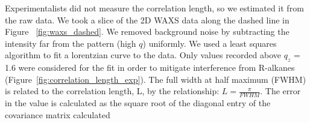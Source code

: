 \documentclass{article}
\begin{document}
  \vspace{1em}
  Experimentalists did not measure the correlation length, so we estimated it from
  the raw data. We took a slice of the 2D WAXS data along the dashed line in Figure
  ~\ref{fig:waxs_dashed}. We removed background noise by subtracting
  the intensity far from the pattern (high $q$) uniformly. We used a least squares
  algorithm to fit a lorentzian curve to the data. Only values recorded above $q_z$ = 1.6 were considered for 
  the fit in order to mitigate interference from R-alkanes (Figure~\ref{fig:correlation_length_exp}).
  The full width at half maximum (FWHM) is related to the correlation length, L, by
  the relationship: $ L = \frac{\pi}{FWHM} $. The error in the value is calculated
  as the square root of the diagonal entry of the covariance matrix calculated 
\end{document}
